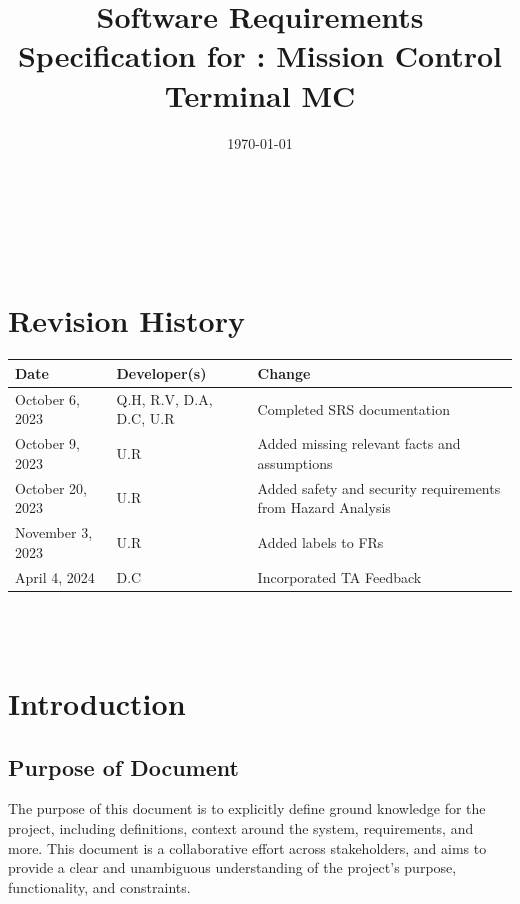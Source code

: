 \documentclass[12pt]{article}
\begin{document}
\title{Software Requirements Specification for \progname: Mission Control Terminal MC} 
\author{\authname}
\date{\today}
	
\maketitle

~\newpage


\tableofcontents

~\newpage

\section*{Revision History}
\begin{table}[hp]
\label{TblRevisionHistory}
\begin{tabularx}{\textwidth}{llX}
\toprule
\textbf{Date} & \textbf{Developer(s)} & \textbf{Change}\\
\midrule
October 6, 2023 & Q.H, R.V, D.A, D.C, U.R & Completed SRS documentation\\
October 9, 2023 & U.R & Added missing relevant facts and assumptions\\
October 20, 2023 & U.R & Added safety and security requirements from Hazard Analysis\\
November 3, 2023 & U.R & Added labels to FRs\\
April 4, 2024 & D.C & Incorporated TA Feedback\\
\bottomrule
\end{tabularx}
\end{table}


~\\

~\newpage

\section{Introduction}
\subsection{Purpose of Document}
The purpose of this document is to explicitly define ground knowledge for the project, including definitions, context around the system, requirements, and more. This document is a collaborative effort across stakeholders, and aims to provide a clear and unambiguous understanding of the project’s purpose, functionality, and constraints.
\end{document}
